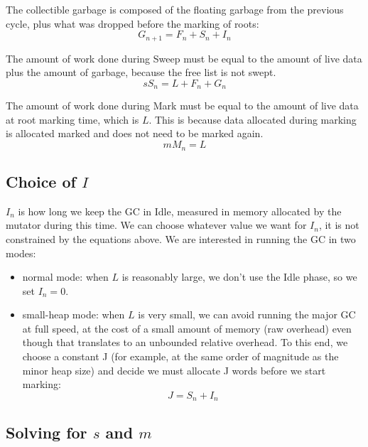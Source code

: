\documentclass{article}
\begin{document}
The collectible garbage is composed of the floating garbage from the
previous cycle, plus what was dropped before the marking of
roots:
\begin{equation}\label{eqn-G}
  G_{n+1} = F_n + S_n + I_n
\end{equation}

The amount of work done during Sweep must be equal to the amount of
live data plus the amount of garbage, because the free list is not
swept.
\begin{equation}\label{eqn-sS}
sS_n = L + F_n + G_n
\end{equation}

The amount of work done during Mark must be equal to the amount of
live data at root marking time, which is $L$. This is because data
allocated during marking is allocated marked and does not need to be
marked again.
\begin{equation}\label{eqn-mM}
mM_n = L
\end{equation}

\subsection[Choice of I]{Choice of $I$}

$I_n$ is how long we keep the GC in Idle, measured in memory allocated
by the mutator during this time. We can choose whatever value we want
for $I_n$, it is not constrained by the equations above. We are
interested in running the GC in two modes:
\begin{itemize}
\item normal mode: when $L$ is reasonably large, we don't use the Idle
phase, so we set $I_n = 0$.
\item small-heap mode: when $L$ is very small,  we can avoid running
the major GC at full speed, at the cost of a small amount of memory
(raw overhead) even though that translates to an unbounded relative
overhead. To this end, we choose a constant J (for example, at the
same order of magnitude as the minor heap size) and decide we must
allocate J words before we start marking:
\begin{equation}\label{def-J}
  J = S_n + I_n
\end{equation}
\end{itemize}

\subsection[Solving for s and m]{Solving for $s$ and $m$}
\end{document}
